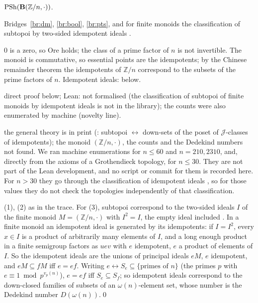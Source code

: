 \begin{trace}
\item[deck] $\mathrm{PSh}(\mathbf{B}(\mathbb Z/n,\cdot))$.
\item[arch] Bridges~\ref{br:dm}, \ref{br:bool}, \ref{br:pts}, and for finite monoids the classification of subtopoi by two-sided idempotent ideals \cite[Prop.~6.1.2]{pirashvili-jncg}.
\item[specialise] $0$ is a zero, so Ore holds; the class of a prime factor of $n$ is not invertible. The monoid is commutative, so essential points are the idempotents; by the Chinese remainder theorem the idempotents of $\mathbb Z/n$ correspond to the subsets of the prime factors of $n$. Idempotent ideals: below.
\item[verify] direct proof below; Lean: not formalised (the classification of subtopoi of finite monoids by idempotent ideals is not in the library); the counts were also enumerated by machine (novelty line).
\item[novelty] the general theory is in print (\cite[Prop.~6.1.2, Prop.~6.3.1, Thm~5.6.1]{pirashvili-jncg}: subtopoi $\leftrightarrow$ down-sets of the poset of $\mathcal J$-classes of idempotents); the monoid $(\mathbb Z/n,\cdot)$, the counts and the Dedekind numbers not found. We ran machine enumerations for $n\le 60$ and $n = 210, 2310$, and, directly from the axioms of a Grothendieck topology, for $n\le 30$. They are not part of the Lean development, and no script or commit for them is recorded here. For $n>30$ they go through the classification of idempotent ideals \cite{pirashvili-jncg}, so for those values they do not check the topologies independently of that classification.
\end{trace}

\direct{} (1), (2) as in the trace. For (3), subtopoi correspond to the two-sided ideals $I$ of the finite monoid $M = (\mathbb Z/n,\cdot)$ with $I^2 = I$, the empty ideal included \cite[Prop.~6.1.2]{pirashvili-jncg}. In a finite monoid an idempotent ideal is generated by its idempotents: if $I = I^2$, every $x\in I$ is a product of arbitrarily many elements of $I$, and a long enough product in a finite semigroup factors as $uev$ with $e$ idempotent, $e$ a product of elements of $I$. So the idempotent ideals are the unions of principal ideals $eM$, $e$ idempotent, and $eM\subseteq fM$ iff $e = ef$. Writing $e\leftrightarrow S_e\subseteq\{\text{primes of }n\}$ (the primes $p$ with $e\equiv 1\bmod p^{v_p(n)}$), $e = ef$ iff $S_e\subseteq S_f$; so idempotent ideals correspond to the down-closed families of subsets of an $\omega(n)$-element set, whose number is the Dedekind number $D(\omega(n))$.\qed


